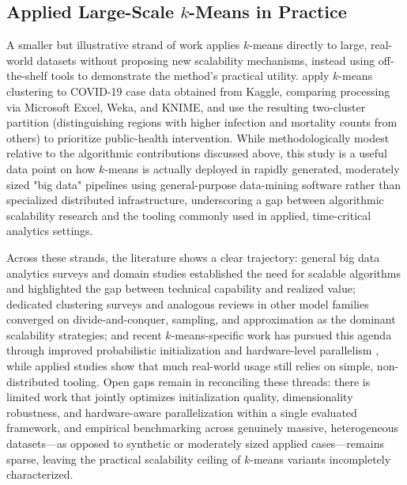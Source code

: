 \subsection{Applied Large-Scale $k$-Means in Practice}
A smaller but illustrative strand of work applies $k$-means directly to large, real-world datasets without proposing new scalability mechanisms, instead using off-the-shelf tools to demonstrate the method's practical utility. \cite{indraputra2020means} apply $k$-means clustering to COVID-19 case data obtained from Kaggle, comparing processing via Microsoft Excel, Weka, and KNIME, and use the resulting two-cluster partition (distinguishing regions with higher infection and mortality counts from others) to prioritize public-health intervention. While methodologically modest relative to the algorithmic contributions discussed above, this study is a useful data point on how $k$-means is actually deployed in rapidly generated, moderately sized "big data" pipelines using general-purpose data-mining software rather than specialized distributed infrastructure, underscoring a gap between algorithmic scalability research and the tooling commonly used in applied, time-critical analytics settings.

Across these strands, the literature shows a clear trajectory: general big data analytics surveys and domain studies \cite{tsai2015big,gunther2017debating,wolfert2017big} established the need for scalable algorithms and highlighted the gap between technical capability and realized value; dedicated clustering surveys \cite{mahdi2021scalable} and analogous reviews in other model families \cite{liu2020when} converged on divide-and-conquer, sampling, and approximation as the dominant scalability strategies; and recent $k$-means-specific work has pursued this agenda through improved probabilistic initialization \cite{hamalainen2020improving} and hardware-level parallelism \cite{awad2022improved}, while applied studies \cite{indraputra2020means} show that much real-world usage still relies on simple, non-distributed tooling. Open gaps remain in reconciling these threads: there is limited work that jointly optimizes initialization quality, dimensionality robustness, and hardware-aware parallelization within a single evaluated framework, and empirical benchmarking across genuinely massive, heterogeneous datasets---as opposed to synthetic or moderately sized applied cases---remains sparse, leaving the practical scalability ceiling of $k$-means variants incompletely characterized.

